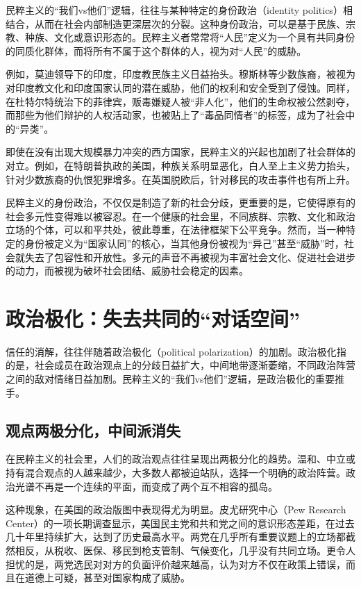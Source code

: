 民粹主义的“我们vs他们”逻辑，往往与某种特定的身份政治（identity politics）相结合，从而在社会内部制造更深层次的分裂。这种身份政治，可以是基于民族、宗教、种族、文化或意识形态的。民粹主义者常常将“人民”定义为一个具有共同身份的同质化群体，而将所有不属于这个群体的人，视为对“人民”的威胁。

例如，莫迪领导下的印度，印度教民族主义日益抬头。穆斯林等少数族裔，被视为对印度教文化和印度国家认同的潜在威胁，他们的权利和安全受到了侵蚀。同样，在杜特尔特统治下的菲律宾，贩毒嫌疑人被“非人化”，他们的生命权被公然剥夺，而那些为他们辩护的人权活动家，也被贴上了“毒品同情者”的标签，成为了社会中的“异类”。

即使在没有出现大规模暴力冲突的西方国家，民粹主义的兴起也加剧了社会群体的对立。例如，在特朗普执政的美国，种族关系明显恶化，白人至上主义势力抬头，针对少数族裔的仇恨犯罪增多。在英国脱欧后，针对移民的攻击事件也有所上升。

民粹主义的身份政治，不仅仅是制造了新的社会分歧，更重要的是，它使得原有的社会多元性变得难以被容忍。在一个健康的社会里，不同族群、宗教、文化和政治立场的个体，可以和平共处，彼此尊重，在法律框架下公平竞争。然而，当一种特定的身份被定义为“国家认同”的核心，当其他身份被视为“异己”甚至“威胁”时，社会就失去了包容性和开放性。多元的声音不再被视为丰富社会文化、促进社会进步的动力，而被视为破坏社会团结、威胁社会稳定的因素。

\section{政治极化：失去共同的“对话空间”}

信任的消解，往往伴随着政治极化（political polarization）的加剧。政治极化指的是，社会成员在政治观点上的分歧日益扩大，中间地带逐渐萎缩，不同政治阵营之间的敌对情绪日益加剧。民粹主义的“我们vs他们”逻辑，是政治极化的重要推手。

\subsection{观点两极分化，中间派消失}

在民粹主义的社会里，人们的政治观点往往呈现出两极分化的趋势。温和、中立或持有混合观点的人越来越少，大多数人都被迫站队，选择一个明确的政治阵营。政治光谱不再是一个连续的平面，而变成了两个互不相容的孤岛。

这种现象，在美国的政治版图中表现得尤为明显。皮尤研究中心（Pew Research Center）的一项长期调查显示，美国民主党和共和党之间的意识形态差距，在过去几十年里持续扩大，达到了历史最高水平。两党在几乎所有重要议题上的立场都截然相反，从税收、医保、移民到枪支管制、气候变化，几乎没有共同立场。更令人担忧的是，两党选民对对方的负面评价越来越高，认为对方不仅在政策上错误，而且在道德上可疑，甚至对国家构成了威胁。

